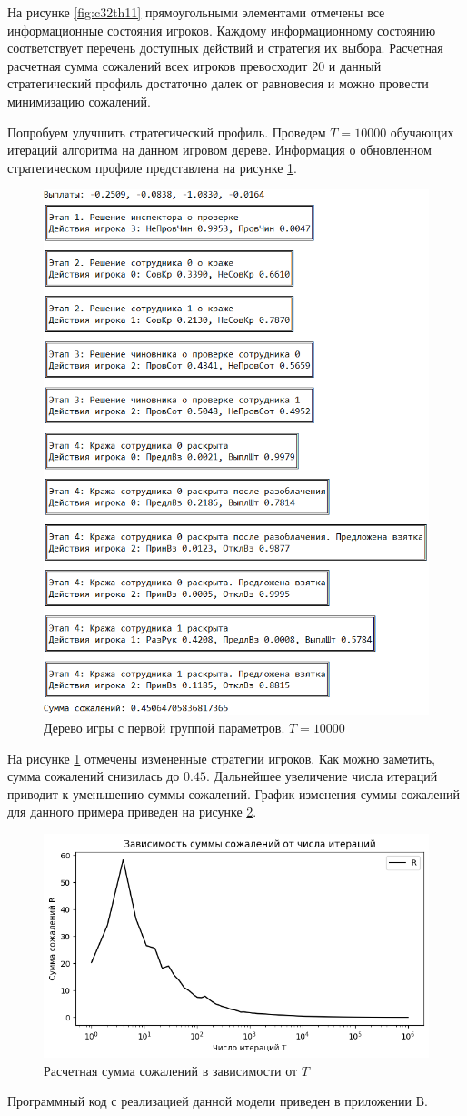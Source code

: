 \par
На рисунке \ref{fig:c32th11} прямоугольными элементами отмечены все информационные состояния игроков. Каждому информационному состоянию соответствует перечень доступных действий и стратегия их выбора. Расчетная расчетная сумма сожалений всех игроков превосходит $20$ и данный стратегический профиль достаточно далек от равновесия и можно провести минимизацию сожалений.
\par
Попробуем улучшить стратегический профиль. Проведем $T=10000$ обучающих итераций алгоритма на данном игровом дереве. Информация о обновленном стратегическом профиле представлена на рисунке \ref{fig:c32th12}.
\begin{figure}[H]
	\centering
	\includegraphics[width=0.8\linewidth]{inc/img/c32th12}
	\caption{Дерево игры с первой группой параметров. $T = 10000$}
	\label{fig:c32th12}
\end{figure}
\par
На рисунке \ref{fig:c32th12} отмечены измененные стратегии игроков. Как можно заметить, сумма сожалений снизилась до $0.45$. Дальнейшее увеличение числа итераций приводит к уменьшению суммы сожалений. График изменения суммы сожалений для данного примера приведен на рисунке \ref{fig:c3r2}.

\begin{figure}[H]
	\centering
	\includegraphics[width=0.8\linewidth]{inc/img/c3r2}
	\caption{Расчетная сумма сожалений в зависимости от $T$}
	\label{fig:c3r2}
\end{figure}

\par
Программный код с реализацией данной модели приведен в приложении В.